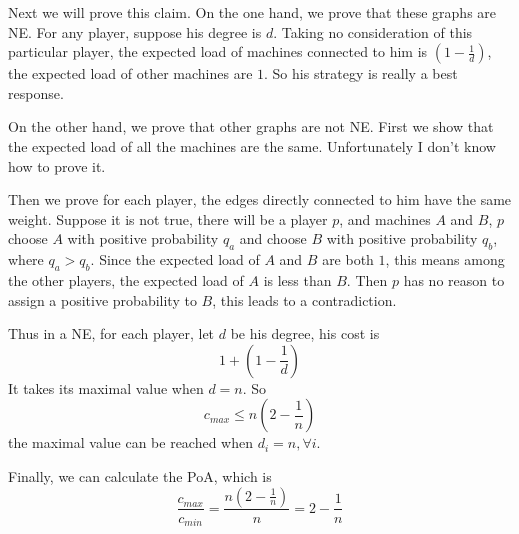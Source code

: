 \documentclass[12pt]{cgtmd}
\begin{document}
\begin{enumerate}
        Next we will prove this claim. On the one hand, we prove that these graphs are NE. For any player, suppose his degree is $d$. Taking no consideration of this particular player, the expected load of machines connected to him is $(1 - \frac{1}{d})$, the expected load of other machines are $1$. So his strategy is really a best response. 
        
        On the other hand, we prove that other graphs are not NE. First we show that the expected load of all the machines are the same. Unfortunately I don't know how to prove it.
        
        Then we prove for each player, the edges directly connected to him have the same weight. Suppose it is not true, there will be a player $p$, and machines $A$ and $B$, $p$ choose $A$ with positive probability $q_a$ and choose $B$ with positive probability $q_b$, where $q_a > q_b$. Since the expected load of $A$ and $B$ are both $1$, this means among the other players, the expected load of $A$ is less than $B$. Then $p$ has no reason to assign a positive probability to $B$, this leads to a contradiction. 

        Thus in a NE, for each player, let $d$ be his degree, his cost is
        $$1 + (1 - \frac{1}{d})$$
        It takes its maximal value when $d = n$. So 
        $$c_{max} \leq n(2 - \frac{1}{n})$$ 
        the maximal value can be reached when $d_i = n, \forall i$.

        Finally, we can calculate the PoA, which is
        $$\frac{c_{max}}{c_{min}} = \frac{n(2 - \frac{1}{n})}{n} = 2 - \frac{1}{n}$$
\end{enumerate}
\end{document}
